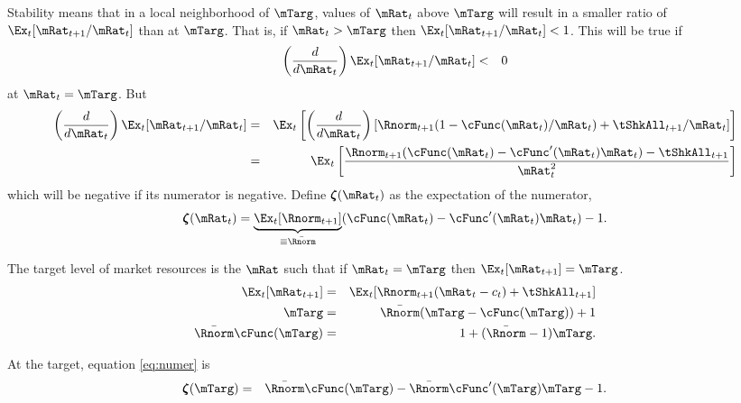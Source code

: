 \documentclass[titlepage]{\econtex}\providecommand{\texname}{BufferStockTheory}%
\begin{document}
{Stability means that in a local neighborhood of $\mTarg$, values of $\mRat_{t}$
above $\mTarg$ will result in a smaller ratio of $\Ex_{t}[{\mRat}%
_{t+1}/\mRat_{t}] $ than at $\mTarg$. That is, if $\mRat_{t} > \mTarg$ then $%
\Ex_{t}[\mRat_{t+1}/\mRat_{t}] < 1 $. This will be true if
\begin{eqnarray}
\left(\frac{d}{d\mRat_t}\right) \Ex_t [{\mRat}_{t+1}/\mRat_t ] & < & 0 \label{eq:stable} \nonumber
\end{eqnarray}
at $\mRat_{t}=\mTarg$.  But \providecommand{\numFunc}{\pmb{\zeta}}
\begin{eqnarray*}
\left( \frac{d}{d\mRat_{t}}\right) \Ex_{t}[{\mRat}_{t+1}/\mRat_{t}] &=&\Ex_{t}\left[
\left( \frac{d}{d\mRat_{t}}\right) \left[ {\Rnorm}_{t+1}(1-\cFunc(\mRat_{t})/\mRat_{t})+%
{\tShkAll}_{t+1}/\mRat_{t}\right] \right]  \nonumber \\
&=&\Ex_{t}\left[ \frac{{\Rnorm}_{t+1}(\cFunc(\mRat_{t})-\cFunc^{\prime}(\mRat_{t})\mRat_{t})-%
{\tShkAll}_{t+1}}{\mRat_{t}^{2}}\right]  \notag
\end{eqnarray*}
which will be negative if its numerator is negative. Define $\numFunc(\mRat_{t})$
as the expectation of the numerator,
\begin{equation}
\numFunc (\mRat_{t})=\underbrace{\Ex_{t}[{\Rnorm}_{t+1}]}_{\equiv \bar{\Rnorm}}(\cFunc(\mRat_{t})-\cFunc^{\prime}(\mRat_{t})\mRat_{t})-1. \label{eq:numer}
\end{equation}

The target level of market resources is the $\mRat$ such that if $\mRat_{t}=\mTarg$ then $\Ex_{t}[\mRat_{t+1}]=\mTarg$.
\begin{eqnarray}
\Ex_{t}[{\mRat}_{t+1}] & = & \Ex_{t}[{\Rnorm}_{t+1}(\mRat_{t}-c_{t})+{%
\tShkAll}_{t+1}] \nonumber \\
\mTarg & = & \bar{\Rnorm}(\mTarg-\cFunc(\mTarg))+1  \nonumber \\
\bar{\Rnorm}\cFunc(\mTarg) & = & 1+(\bar{\Rnorm}-1)\mTarg  \label{eq:cstar}.
\end{eqnarray}

At the target, equation \eqref{eq:numer} is
\begin{eqnarray}
\numFunc(\mTarg) & = & \bar{\Rnorm}\cFunc(\mTarg) - \bar{\Rnorm}\cFunc^{\prime}(\mTarg)\mTarg - 1.  \label{eq:numerxstar} \nonumber
\end{eqnarray}

}
\end{document}
